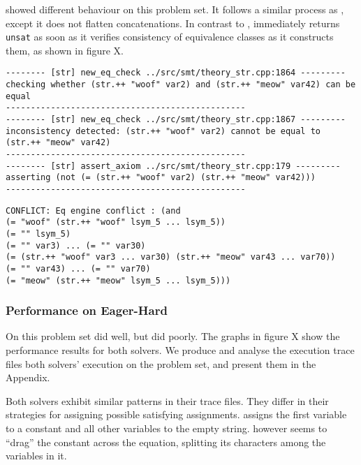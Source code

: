             \us{} showed different behaviour on this problem set. It follows a similar process as \cvc{}, except it does not flatten concatenations. In contrast to \cvc{}, \us{} immediately returns \texttt{unsat} as soon as it verifies consistency of equivalence classes as it constructs them, as shown in figure X.

            {\scriptsize\begin{verbatim}
-------- [str] new_eq_check ../src/smt/theory_str.cpp:1864 ---------
checking whether (str.++ "woof" var2) and (str.++ "meow" var42) can be equal
------------------------------------------------
-------- [str] new_eq_check ../src/smt/theory_str.cpp:1867 ---------
inconsistency detected: (str.++ "woof" var2) cannot be equal to (str.++ "meow" var42)
------------------------------------------------
-------- [str] assert_axiom ../src/smt/theory_str.cpp:179 ---------
asserting (not (= (str.++ "woof" var2) (str.++ "meow" var42)))
------------------------------------------------
            \end{verbatim}}

            {\scriptsize\begin{verbatim}
CONFLICT: Eq engine conflict : (and
(= "woof" (str.++ "woof" lsym_5 ... lsym_5))
(= "" lsym_5)
(= "" var3) ... (= "" var30)
(= (str.++ "woof" var3 ... var30) (str.++ "meow" var43 ... var70))
(= "" var43) ... (= "" var70)
(= "meow" (str.++ "meow" lsym_5 ... lsym_5)))
            \end{verbatim}}


        \subsubsection{Performance on Eager-Hard}

            On this problem set \cvc{} did well, but \us{} did poorly. The graphs in figure X show the performance results for both solvers. We produce and analyse the execution trace files both solvers' execution on the problem set, and present them in the Appendix.

            Both solvers exhibit similar patterns in their trace files. They differ in their strategies for assigning possible satisfying assignments. \cvc{} assigns the first variable to a constant and all other variables to the empty string. \us{} however seems to ``drag'' the constant across the equation, splitting its characters among the variables in it.

